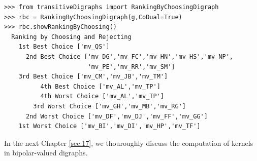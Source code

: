 \begin{lstlisting}[caption={Bipolar ranking-by-choosing the Grafitti movies},label=list:16.9]
>>> from transitiveDigraphs import RankingByChoosingDigraph
>>> rbc = RankingByChoosingDigraph(g,CoDual=True)
>>> rbc.showRankingByChoosing()
  Ranking by Choosing and Rejecting
    1st Best Choice ['mv_QS']
      2nd Best Choice ['mv_DG','mv_FC','mv_HN','mv_HS','mv_NP',
                       'mv_PE','mv_RR','mv_SM']
	3rd Best Choice ['mv_CM','mv_JB','mv_TM']
          4th Best Choice ['mv_AL','mv_TP']
          4th Worst Choice ['mv_AL','mv_TP']
        3rd Worst Choice ['mv_GH','mv_MB','mv_RG']
      2nd Worst Choice ['mv_DF','mv_DJ','mv_FF','mv_GG']
    1st Worst Choice ['mv_BI','mv_DI','mv_HP','mv_TF']
\end{lstlisting}

In the next Chapter \ref{sec:17}, we thouroughly discuss the computation of kernels in bipolar-valued digraphs.

\clearpage


%